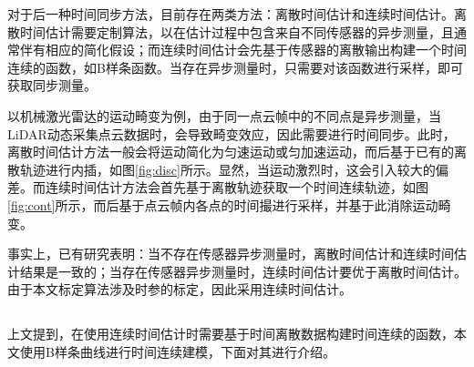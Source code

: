 对于后一种时间同步方法，目前存在两类方法：离散时间估计和连续时间估计。离散时间估计需要定制算法，以在估计过程中包含来自不同传感器的异步测量，且通常伴有相应的简化假设；而连续时间估计会先基于传感器的离散输出构建一个时间连续的函数，如B样条函数。当存在异步测量时，只需要对该函数进行采样，即可获取同步测量。

以机械激光雷达的运动畸变为例，由于同一点云帧中的不同点是异步测量，当LiDAR动态采集点云数据时，会导致畸变效应，因此需要进行时间同步。此时，离散时间估计方法一般会将运动简化为匀速运动或匀加速运动，而后基于已有的离散轨迹进行内插，如图\ref{fig:disc}所示。显然，当运动激烈时，这会引入较大的偏差。而连续时间估计方法会首先基于离散轨迹获取一个时间连续轨迹，如图\ref{fig:cont}所示，而后基于点云帧内各点的时间撮进行采样，并基于此消除运动畸变。

事实上，已有研究表明：当不存在传感器异步测量时，离散时间估计和连续时间估计结果是一致的；当存在传感器异步测量时，连续时间估计要优于离散时间估计\cite{cioffi2022continuous}。由于本文标定算法涉及时参的标定，因此采用连续时间估计。
\subsection{}
\label{subsubsec:pose_bspline}
上文提到，在使用连续时间估计时需要基于时间离散数据构建时间连续的函数，本文使用B样条曲线进行时间连续建模，下面对其进行介绍。

